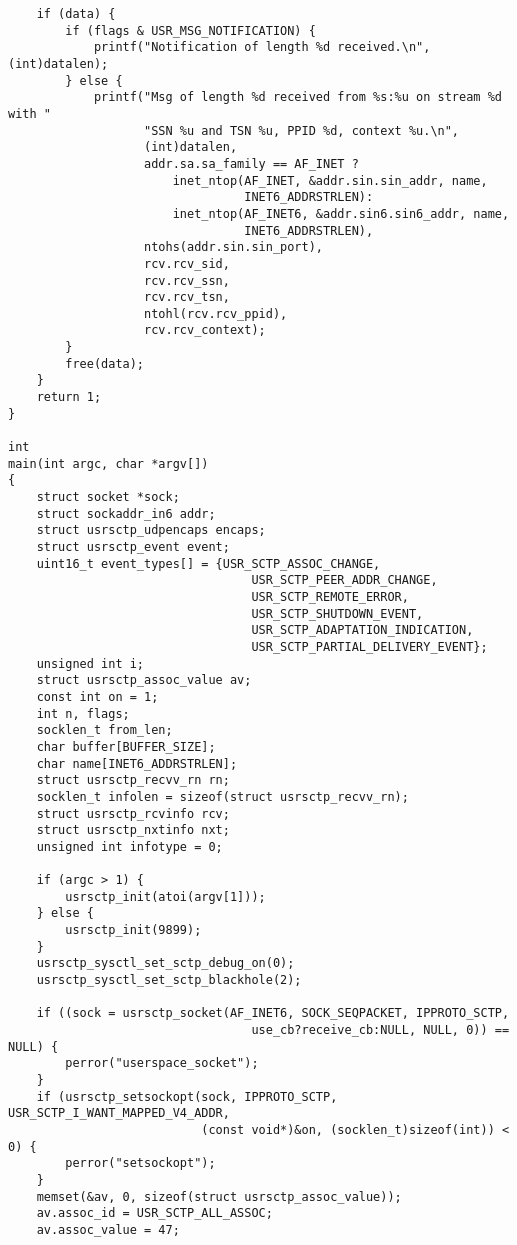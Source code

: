 \documentclass[a4paper]{article}
\begin{document}
\begin{verbatim}
    if (data) {
        if (flags & USR_MSG_NOTIFICATION) {
            printf("Notification of length %d received.\n", (int)datalen);
        } else {
            printf("Msg of length %d received from %s:%u on stream %d with "
                   "SSN %u and TSN %u, PPID %d, context %u.\n",
                   (int)datalen,
                   addr.sa.sa_family == AF_INET ?
                       inet_ntop(AF_INET, &addr.sin.sin_addr, name, 
                                 INET6_ADDRSTRLEN):
                       inet_ntop(AF_INET6, &addr.sin6.sin6_addr, name, 
                                 INET6_ADDRSTRLEN),
                   ntohs(addr.sin.sin_port),
                   rcv.rcv_sid,
                   rcv.rcv_ssn,
                   rcv.rcv_tsn,
                   ntohl(rcv.rcv_ppid),
                   rcv.rcv_context);
        }
        free(data);
    }
    return 1;
}

int
main(int argc, char *argv[])
{
    struct socket *sock;
    struct sockaddr_in6 addr;
    struct usrsctp_udpencaps encaps;
    struct usrsctp_event event;
    uint16_t event_types[] = {USR_SCTP_ASSOC_CHANGE,
	                              USR_SCTP_PEER_ADDR_CHANGE,
	                              USR_SCTP_REMOTE_ERROR,
	                              USR_SCTP_SHUTDOWN_EVENT,
	                              USR_SCTP_ADAPTATION_INDICATION,
	                              USR_SCTP_PARTIAL_DELIVERY_EVENT};
    unsigned int i;
    struct usrsctp_assoc_value av;
    const int on = 1;
    int n, flags;
    socklen_t from_len;
    char buffer[BUFFER_SIZE];
    char name[INET6_ADDRSTRLEN];
    struct usrsctp_recvv_rn rn;
    socklen_t infolen = sizeof(struct usrsctp_recvv_rn);
    struct usrsctp_rcvinfo rcv;
    struct usrsctp_nxtinfo nxt;
    unsigned int infotype = 0;

    if (argc > 1) {
        usrsctp_init(atoi(argv[1]));
    } else {
        usrsctp_init(9899);
    }
    usrsctp_sysctl_set_sctp_debug_on(0);
    usrsctp_sysctl_set_sctp_blackhole(2);

    if ((sock = usrsctp_socket(AF_INET6, SOCK_SEQPACKET, IPPROTO_SCTP, 
    	                          use_cb?receive_cb:NULL, NULL, 0)) == NULL) {
        perror("userspace_socket");
    }
    if (usrsctp_setsockopt(sock, IPPROTO_SCTP, USR_SCTP_I_WANT_MAPPED_V4_ADDR, 
                           (const void*)&on, (socklen_t)sizeof(int)) < 0) {
        perror("setsockopt");
    }
    memset(&av, 0, sizeof(struct usrsctp_assoc_value));
    av.assoc_id = USR_SCTP_ALL_ASSOC;
    av.assoc_value = 47;


\end{verbatim}
\end{document}
